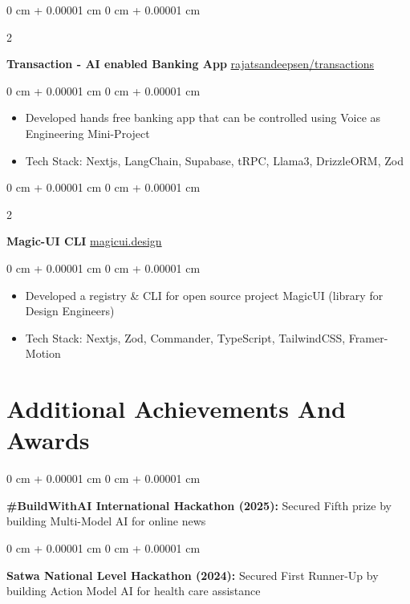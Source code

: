 \documentclass[10pt, letterpaper]{article}
\newenvironment{highlights}{
    \begin{itemize}[
        topsep=0.10 cm,
        parsep=0.10 cm,
        partopsep=0pt,
        itemsep=0pt,
        leftmargin=0 cm + 10pt
    ]
}{
    \end{itemize}
} %
\newenvironment{onecolentry}{
    \begin{adjustwidth}{
        0 cm + 0.00001 cm
    }{
        0 cm + 0.00001 cm
    }
}{
    \end{adjustwidth}
} %
\newenvironment{twocolentry}[2][]{
    \onecolentry
    \def\secondColumn{#2}
    \setcolumnwidth{\fill, 4.5 cm}
    \begin{paracol}{2}
}{
    \switchcolumn \raggedleft \secondColumn
    \end{paracol}
    \endonecolentry
} %
\begin{document}
\begin{twocolentry}{
		\href{https://github.com/rajatsandeepsen/transactions}{rajatsandeepsen/transactions}
	}
	\textbf{Transaction - AI enabled Banking App}\end{twocolentry}

\vspace{0.10 cm}
\begin{onecolentry}
	\begin{highlights}
		\item Developed hands free banking app that can be controlled using Voice as
		Engineering Mini-Project
		\item Tech Stack: Nextjs, LangChain, Supabase, tRPC, Llama3, DrizzleORM, Zod
	\end{highlights}
\end{onecolentry}
\vspace{0.2 cm}

\begin{twocolentry}{
		\href{https://magicui.design/}{magicui.design}
	}
	\textbf{Magic-UI CLI}\end{twocolentry}

\vspace{0.10 cm}
\begin{onecolentry}
	\begin{highlights}
		\item Developed a registry \& CLI for open source project MagicUI (library for Design
		Engineers)
		\item Tech Stack: Nextjs, Zod, Commander, TypeScript, TailwindCSS, Framer-Motion
	\end{highlights}
\end{onecolentry}

\section{Additional Achievements And Awards}

\vspace{0.2 cm}
\begin{onecolentry}
	\textbf{\#BuildWithAI International Hackathon (2025):} Secured Fifth prize by building Multi-Model AI for online news
\end{onecolentry}

\vspace{0.2 cm}
\begin{onecolentry}
	\textbf{Satwa National Level Hackathon (2024):} Secured First Runner-Up by building Action Model AI for health care assistance
\end{onecolentry}
\end{document}
